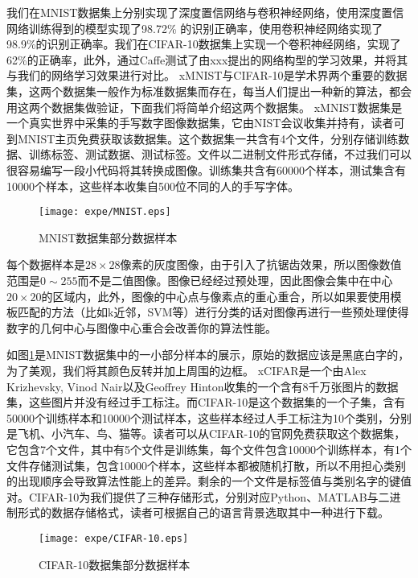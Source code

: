 我们在MNIST数据集上分别实现了深度置信网络与卷积神经网络，使用深度置信网络训练得到的模型实现了98.72\% 的识别正确率，使用卷积神经网络实现了98.9\%的识别正确率。我们在CIFAR-10数据集上实现一个卷积神经网络，实现了62\%的正确率，此外，通过Caffe测试了由xxx提出的网络构型的学习效果，并将其与我们的网络学习效果进行对比。
xMNIST与CIFAR-10是学术界两个重要的数据集，这两个数据集一般作为标准数据集而存在，每当人们提出一种新的算法，都会用这两个数据集做验证，下面我们将简单介绍这两个数据集。
xMNIST数据集是一个真实世界中采集的手写数字图像数据集，它由NIST会议收集并持有，读者可到MNIST主页免费获取该数据集。这个数据集一共含有4个文件，分别存储训练数据、训练标签、测试数据、测试标签。文件以二进制文件形式存储，不过我们可以很容易编写一段小代码将其转换成图像。训练集共含有60000个样本，测试集含有10000个样本，这些样本收集自500位不同的人的手写字体。

\begin{figure}[!htbp]
\centering
\texttt{[image: expe/MNIST.eps]}
\caption{MNIST数据集部分数据样本}
\label{img:MNIST data}
\end{figure}

每个数据样本是$28\times 28$像素的灰度图像，由于引入了抗锯齿效果，所以图像数值范围是$0\sim 255$而不是二值图像。图像已经经过预处理，因此图像会集中在中心$20\times 20$的区域内，此外，图像的中心点与像素点的重心重合，所以如果要使用模板匹配的方法（比如k近邻，SVM等）进行分类的话对图像再进行一些预处理使得数字的几何中心与图像中心重合会改善你的算法性能。



如图\ref{img:MNIST data}是MNIST数据集中的一小部分样本的展示，原始的数据应该是黑底白字的，为了美观，我们将其颜色反转并加上周围的边框。
xCIFAR是一个由Alex Krizhevsky, Vinod Nair以及Geoffrey Hinton收集的一个含有8千万张图片的数据集，这些图片并没有经过手工标注。而CIFAR-10是这个数据集的一个子集，含有50000个训练样本和10000个测试样本，这些样本经过人手工标注为10个类别，分别是飞机、小汽车、鸟、猫等。读者可以从CIFAR-10的官网免费获取这个数据集，它包含7个文件，其中有5个文件是训练集，每个文件包含10000个训练样本，有1个文件存储测试集，包含10000个样本，这些样本都被随机打散，所以不用担心类别的出现顺序会导致算法性能上的差异。剩余的一个文件是标签值与类别名字的键值对。CIFAR-10为我们提供了三种存储形式，分别对应Python、MATLAB与二进制形式的数据存储格式，读者可根据自己的语言背景选取其中一种进行下载。

\begin{figure}[!htbp]
\centering
\texttt{[image: expe/CIFAR-10.eps]}
\caption{CIFAR-10数据集部分数据样本}
\label{img:CIFAR data}
\end{figure}

